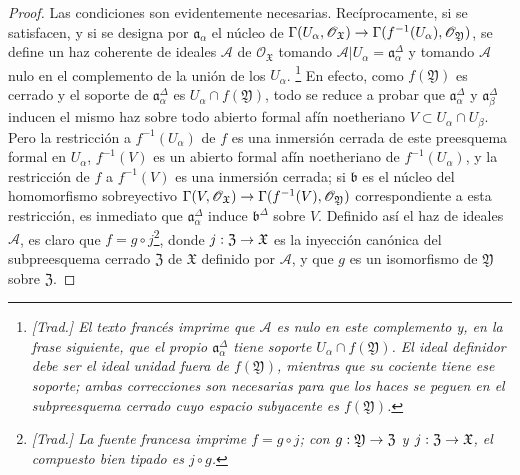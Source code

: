 \documentclass[oneside]{amsart}
\theoremstyle{ega-env-style}
\theoremstyle{ega-thm-env-style}
\theoremstyle{ega-defn-env-style}
\def\mathcal{\mathscr}
\def\sh{\mathcal}                   %
\renewcommand{\to}{\mathchoice{\longrightarrow}{\rightarrow}{\rightarrow}{\rightarrow}}
\begin{document}
\begin{proof}
Las condiciones son evidentemente necesarias.
Recíprocamente, si se satisfacen, y si se designa por $\mathfrak{a}_\alpha$ el núcleo de $\Gamma(U_\alpha,\mathscr{O}_{\mathfrak{X}})\to
\Gamma(f^{-1}(U_\alpha),\mathscr{O}_{\mathfrak{Y}})$, se define un haz coherente de ideales $\mathscr{A}$ de $\mathscr{O}_{\mathfrak{X}}$ tomando $\mathscr{A}|U_\alpha=\mathfrak{a}_\alpha^\Delta$ y tomando $\mathscr{A}$ nulo en el complemento de la unión de los $U_\alpha$.
\footnote{\emph{[Trad.] El texto francés imprime que $\sh{A}$ es nulo en este complemento y, en la frase siguiente, que el propio $\mathfrak{a}_\alpha^\Delta$ tiene soporte $U_\alpha\cap f(\mathfrak{Y})$. El ideal definidor debe ser el ideal unidad fuera de $f(\mathfrak{Y})$, mientras que su cociente tiene ese soporte; ambas correcciones son necesarias para que los haces se peguen en el subpreesquema cerrado cuyo espacio subyacente es $f(\mathfrak{Y})$.}}
En efecto, como $f(\mathfrak{Y})$ es cerrado y el soporte de $\mathfrak{a}_\alpha^\Delta$ es $U_\alpha\cap f(\mathfrak{Y})$, todo se reduce a probar que $\mathfrak{a}_\alpha^\Delta$ y $\mathfrak{a}_\beta^\Delta$ inducen el mismo haz sobre todo abierto formal afín noetheriano $V\subset U_\alpha\cap U_\beta$.
Pero la restricción a $f^{-1}(U_\alpha)$ de $f$ es una inmersión cerrada de este preesquema formal en $U_\alpha$, $f^{-1}(V)$ es un abierto formal afín noetheriano de $f^{-1}(U_\alpha)$, y la restricción de $f$ a $f^{-1}(V)$ es una inmersión cerrada;
si $\mathfrak{b}$ es el núcleo del homomorfismo sobreyectivo $\Gamma(V,\mathscr{O}_{\mathfrak{X}})\to
\Gamma(f^{-1}(V),\mathscr{O}_{\mathfrak{Y}})$ correspondiente a esta restricción, es inmediato  que $\mathfrak{a}_\alpha^\Delta$ induce $\mathfrak{b}^\Delta$ sobre $V$.
Definido así el haz de ideales $\mathscr{A}$, es claro que $f=g\circ j$\footnote{\emph{[Trad.] La fuente francesa imprime $f=g\circ j$; con $g:\mathfrak{Y}\to\mathfrak{Z}$ y $j:\mathfrak{Z}\to\mathfrak{X}$, el compuesto bien tipado es $j\circ g$.}}, donde $j:\mathfrak{Z}\to\mathfrak{X}$ es la inyección canónica del subpreesquema cerrado $\mathfrak{Z}$ de $\mathfrak{X}$ definido por $\mathscr{A}$, y que $g$ es un isomorfismo de $\mathfrak{Y}$ sobre $\mathfrak{Z}$.
\end{proof}
\end{document}
